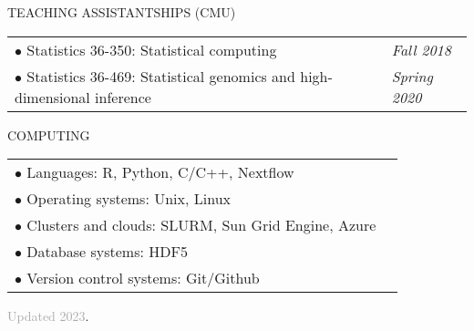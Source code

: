 \documentclass{resume} %
\begin{document}
\begin{rSection}{TEACHING ASSISTANTSHIPS (CMU)}
	\begin{tabular}{p{14cm}R{2.5cm}}
		$\bullet$ Statistics 36-350: Statistical computing 
		& \textit{Fall 2018} \\ 
		$\bullet$ Statistics 36-469: Statistical genomics and high-dimensional inference & \textit{Spring 2020}
	\end{tabular} 
\end{rSection}

\begin{rSection}{COMPUTING}
	
	\begin{tabular}{p{14cm}R{2.5cm}}
		$\bullet$ Languages:  R, Python, C/C++, Nextflow  &   \\ 
		$\bullet$ Operating systems: Unix, Linux & \\
		$\bullet$ Clusters and clouds: SLURM, Sun Grid Engine, Azure & \\
		$\bullet$ Database systems: HDF5 & \\
		$\bullet$ Version control systems: Git/Github
	\end{tabular} 
	
\end{rSection}

\textcolor{darkgray}{Updated 2023}.
\end{document}
